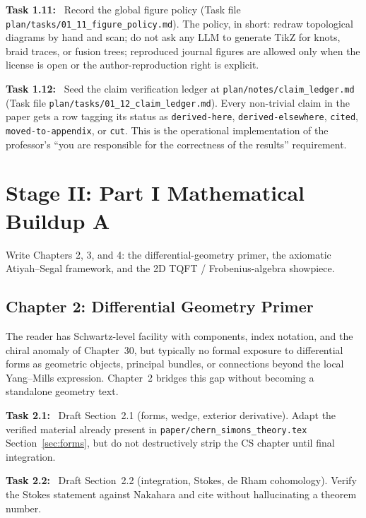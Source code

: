 \documentclass[11pt]{article}
\newcommand{\task}[1]{\medskip\noindent\textbf{Task #1:}\ }
\begin{document}
\task{1.11} Record the global figure policy (Task file
\texttt{plan/tasks/01\_11\_figure\_policy.md}). The policy, in short: redraw topological
diagrams by hand and scan; do not ask any LLM to generate TikZ for knots, braid traces,
or fusion trees; reproduced journal figures are allowed only when the license is open or
the author-reproduction right is explicit.

\task{1.12} Seed the claim verification ledger at \texttt{plan/notes/claim\_ledger.md}
(Task file \texttt{plan/tasks/01\_12\_claim\_ledger.md}). Every non-trivial claim in the
paper gets a row tagging its status as \texttt{derived-here}, \texttt{derived-elsewhere},
\texttt{cited}, \texttt{moved-to-appendix}, or \texttt{cut}. This is the operational
implementation of the professor's ``you are responsible for the correctness of the
results'' requirement.

\section{Stage II: Part I Mathematical Buildup A}\label{sec:stageII}

\begin{goalbox}[Objective]
Write Chapters 2, 3, and 4: the differential-geometry primer, the axiomatic
Atiyah--Segal framework, and the 2D TQFT / Frobenius-algebra showpiece.
\end{goalbox}

\subsection{Chapter 2: Differential Geometry Primer}

\begin{insight}
The reader has Schwartz-level facility with components, index notation, and the chiral
anomaly of Chapter~30, but typically no formal exposure to differential forms as
geometric objects, principal bundles, or connections beyond the local Yang--Mills
expression. Chapter~2 bridges this gap without becoming a standalone geometry text.
\end{insight}

\task{2.1} Draft Section~2.1 (forms, wedge, exterior derivative). Adapt the verified
material already present in \texttt{paper/chern\_simons\_theory.tex} Section~\ref{sec:forms},
but do not destructively strip the CS chapter until final integration.

\task{2.2} Draft Section~2.2 (integration, Stokes, de Rham cohomology). Verify the
Stokes statement against Nakahara and cite without hallucinating a theorem number.
\end{document}

